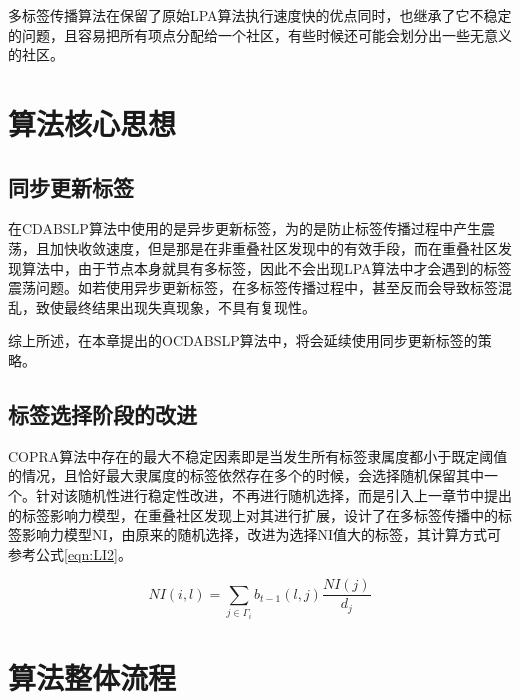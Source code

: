 多标签传播算法在保留了原始LPA算法执行速度快的优点同时，也继承了它不稳定的问题，且容易把所有项点分配给一个社区，有些时候还可能会划分出一些无意义的社区。

\section{算法核心思想}

\subsection{同步更新标签}

在CDABSLP算法中使用的是异步更新标签，为的是防止标签传播过程中产生震荡，且加快收敛速度，但是那是在非重叠社区发现中的有效手段，而在重叠社区发现算法中，由于节点本身就具有多标签，因此不会出现LPA算法中才会遇到的标签震荡问题。如若使用异步更新标签，在多标签传播过程中，甚至反而会导致标签混乱，致使最终结果出现失真现象，不具有复现性。

综上所述，在本章提出的OCDABSLP算法中，将会延续使用同步更新标签的策略。

\subsection{标签选择阶段的改进}

COPRA算法中存在的最大不稳定因素即是当发生所有标签隶属度都小于既定阈值的情况，且恰好最大隶属度的标签依然存在多个的时候，会选择随机保留其中一个。针对该随机性进行稳定性改进，不再进行随机选择，而是引入上一章节中提出的标签影响力模型，在重叠社区发现上对其进行扩展，设计了在多标签传播中的标签影响力模型NI，由原来的随机选择，改进为选择NI值大的标签，其计算方式可参考公式\ref{eqn:LI2}。

\begin{equation}
  \label{eqn:LI2}
  NI(i,l)=\sum_{j \in \Gamma _i} b_{t-1}(l,j) \frac{NI(j)}{d_j}
\end{equation}

\section{算法整体流程}

